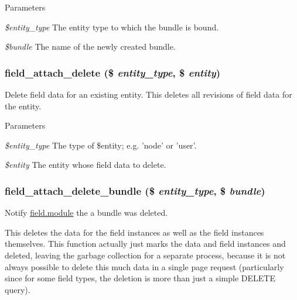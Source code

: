 \begin{DoxyParams}{Parameters}
\item[{\em \$entity\_\-type}]The entity type to which the bundle is bound. \item[{\em \$bundle}]The name of the newly created bundle. \end{DoxyParams}
\hypertarget{group__field__attach_gac2e3658c9c02d0d0e71359f9ef2f207a}{
\subsubsection[{field\_\-attach\_\-delete}]{\setlength{\rightskip}{0pt plus 5cm}field\_\-attach\_\-delete (\$ {\em entity\_\-type}, \/  \$ {\em entity})}}
\label{group__field__attach_gac2e3658c9c02d0d0e71359f9ef2f207a}
Delete field data for an existing entity. This deletes all revisions of field data for the entity.


\begin{DoxyParams}{Parameters}
\item[{\em \$entity\_\-type}]The type of \$entity; e.g. 'node' or 'user'. \item[{\em \$entity}]The entity whose field data to delete. \end{DoxyParams}
\hypertarget{group__field__attach_ga97e62a6e4ef80e5513c9ec085d718c7b}{
\subsubsection[{field\_\-attach\_\-delete\_\-bundle}]{\setlength{\rightskip}{0pt plus 5cm}field\_\-attach\_\-delete\_\-bundle (\$ {\em entity\_\-type}, \/  \$ {\em bundle})}}
\label{group__field__attach_ga97e62a6e4ef80e5513c9ec085d718c7b}
Notify \hyperlink{field_8module}{field.module} the a bundle was deleted.

This deletes the data for the field instances as well as the field instances themselves. This function actually just marks the data and field instances and deleted, leaving the garbage collection for a separate process, because it is not always possible to delete this much data in a single page request (particularly since for some field types, the deletion is more than just a simple DELETE query).


